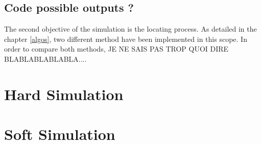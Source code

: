 \subsection{Code possible outputs ?}

The second objective of the simulation is the locating process. As detailed in the chapter \ref{algos}, two different method have been implemented in this scope. In order to compare both methods, JE NE SAIS PAS TROP QUOI DIRE BLABLABLABLABLA....

\section{Hard Simulation}


\section{Soft Simulation}
